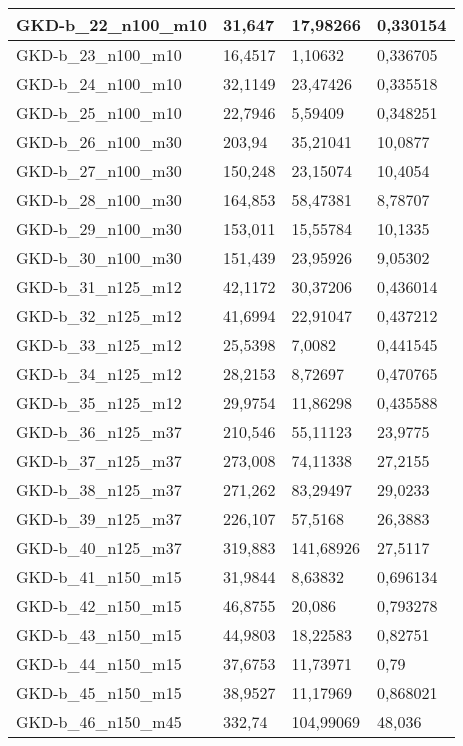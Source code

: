 \begin{table}[!ht]
\begin{adjustbox}{height=12cm}
\begin{tabular}{|l|l|l|l|}
		GKD-b\_22\_n100\_m10 & 31,647  & 17,98266  & 0,330154  \\ \hline
		GKD-b\_23\_n100\_m10 & 16,4517 & 1,10632   & 0,336705  \\ \hline
		GKD-b\_24\_n100\_m10 & 32,1149 & 23,47426  & 0,335518  \\ \hline
		GKD-b\_25\_n100\_m10 & 22,7946 & 5,59409   & 0,348251  \\ \hline
		GKD-b\_26\_n100\_m30 & 203,94  & 35,21041  & 10,0877   \\ \hline
		GKD-b\_27\_n100\_m30 & 150,248 & 23,15074  & 10,4054   \\ \hline
		GKD-b\_28\_n100\_m30 & 164,853 & 58,47381  & 8,78707   \\ \hline
		GKD-b\_29\_n100\_m30 & 153,011 & 15,55784  & 10,1335   \\ \hline
		GKD-b\_30\_n100\_m30 & 151,439 & 23,95926  & 9,05302   \\ \hline
		GKD-b\_31\_n125\_m12 & 42,1172 & 30,37206  & 0,436014  \\ \hline
		GKD-b\_32\_n125\_m12 & 41,6994 & 22,91047  & 0,437212  \\ \hline
		GKD-b\_33\_n125\_m12 & 25,5398 & 7,0082    & 0,441545  \\ \hline
		GKD-b\_34\_n125\_m12 & 28,2153 & 8,72697   & 0,470765  \\ \hline
		GKD-b\_35\_n125\_m12 & 29,9754 & 11,86298  & 0,435588  \\ \hline
		GKD-b\_36\_n125\_m37 & 210,546 & 55,11123  & 23,9775   \\ \hline
		GKD-b\_37\_n125\_m37 & 273,008 & 74,11338  & 27,2155   \\ \hline
		GKD-b\_38\_n125\_m37 & 271,262 & 83,29497  & 29,0233   \\ \hline
		GKD-b\_39\_n125\_m37 & 226,107 & 57,5168   & 26,3883   \\ \hline
		GKD-b\_40\_n125\_m37 & 319,883 & 141,68926 & 27,5117   \\ \hline
		GKD-b\_41\_n150\_m15 & 31,9844 & 8,63832   & 0,696134  \\ \hline
		GKD-b\_42\_n150\_m15 & 46,8755 & 20,086    & 0,793278  \\ \hline
		GKD-b\_43\_n150\_m15 & 44,9803 & 18,22583  & 0,82751   \\ \hline
		GKD-b\_44\_n150\_m15 & 37,6753 & 11,73971  & 0,79      \\ \hline
		GKD-b\_45\_n150\_m15 & 38,9527 & 11,17969  & 0,868021  \\ \hline
		GKD-b\_46\_n150\_m45 & 332,74  & 104,99069 & 48,036    \\ \hline

\end{tabular}
\end{adjustbox}
\end{table}
